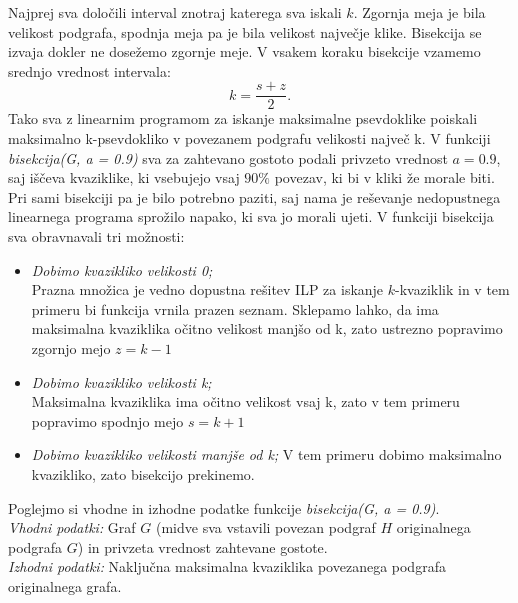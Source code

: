 \documentclass[12pt,a4paper]{amsart}
\theoremstyle{definition}
\theoremstyle{plain}
\begin{document}
\begin{itemize}
Najprej sva določili interval znotraj katerega sva iskali $k$. Zgornja meja je bila velikost podgrafa, spodnja meja pa je bila velikost največje klike. Bisekcija se izvaja dokler ne dosežemo zgornje meje. V vsakem koraku bisekcije vzamemo srednjo vrednost intervala: $$k = \frac{s+z}{2}.$$
Tako sva z linearnim programom za iskanje maksimalne psevdoklike poiskali maksimalno k-psevdokliko v povezanem podgrafu velikosti največ k.
V funkciji \textit{bisekcija(G, a = 0.9)} sva za zahtevano gostoto podali privzeto vrednost $a = 0.9$, saj iščeva kvaziklike, ki vsebujejo vsaj $90\%$ povezav, ki bi v kliki že morale biti. Pri sami bisekciji pa je bilo potrebno paziti, saj nama je reševanje nedopustnega linearnega programa sprožilo napako, ki sva jo morali ujeti. V funkciji bisekcija sva obravnavali tri možnosti:\\

\begin{itemize}
\item \textit{Dobimo kvazikliko velikosti 0;}\\ Prazna množica je vedno dopustna rešitev ILP za iskanje $k$-kvaziklik in v tem primeru bi funkcija vrnila prazen seznam. Sklepamo lahko, da ima maksimalna kvaziklika očitno velikost manjšo od k, zato ustrezno popravimo zgornjo mejo $z = k-1$\\

\item \textit{Dobimo kvazikliko velikosti k;}\\
Maksimalna kvaziklika ima očitno velikost vsaj k, zato  v tem primeru popravimo spodnjo mejo $s=k+1$\\

\item \textit{Dobimo kvazikliko velikosti manjše od k;}
V tem primeru dobimo  maksimalno kvazikliko, zato bisekcijo prekinemo.\\
\end{itemize}

Poglejmo si vhodne in izhodne podatke funkcije \textit{bisekcija(G, a = 0.9)}.\\
 
\textit{Vhodni podatki:} Graf $G$ (midve sva vstavili povezan podgraf $H$ originalnega podgrafa $G$) in privzeta vrednost zahtevane gostote.
\\

\textit{Izhodni podatki:} Naključna maksimalna kvaziklika povezanega podgrafa originalnega grafa.

\end{itemize}
\end{document}
